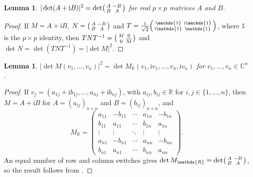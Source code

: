 \documentclass{birkjour}
\newcommand{\OMIT}[1]{\todo[color=gray!30]{#1}}  %
\newtheorem{lemma}[theorem]{Lemma}
\theoremstyle{definition}
\def\R			{\mathds{R}}
\def\C			{\mathds{C}}
\def\Id			{\mathds{1}}
\def\im	 					{\mathrm{i}}				%
\begin{document}
\begin{lemma}\label{pr:lema}
	$|\det (A+\im B)|^2 = \det \begin{psmallmatrix}
		A & -B \\
		B & A
	\end{psmallmatrix}$
	for real $p \times p$ matrices $A$ and $B$.
\end{lemma}
\begin{proof}
	If
	$M = A+\im B$,
	$N = \begin{psmallmatrix}
			A & -B \\
			B & A
		\end{psmallmatrix}$
	and 
	$T = \frac{1}{\sqrt{2}} 
	\begin{psmallmatrix}
		\Id & \im \Id \\
		\im \Id & \Id
	\end{psmallmatrix}$,
	where $\Id$ is the $p \times p$ identity,
	then
	\OMIT{$T^{-1} = \frac{1}{\sqrt{2}} \cdot
		\begin{psmallmatrix}
			\Id & -\im \Id \\
			-\im \Id & \Id
		\end{psmallmatrix}$}
	$T N T^{-1} = \begin{psmallmatrix}
		M & 0 \\
		0 & \overline{M}
	\end{psmallmatrix}$
	and
	$\det N = \det(T N T^{-1}) = |\det M|^2$.
\end{proof}



\begin{lemma}\label{pr:det MR}
	$|\det M(v_1,\ldots,v_n)|^2 = \det M_\R(v_1,\im v_1,\ldots,v_n,\im v_n)$ for $v_1,\ldots,v_n \in \C^n$.
\end{lemma}
\begin{proof}
	If $v_j = (a_{1j} + \im b_{1j},\ldots,a_{nj} + \im b_{nj})$, with $a_{ij},b_{ij}\in \R$ for $i,j \in \{1,\ldots,n\}$, then
	$M = A+\im B$ for $A = (a_{ij})_{n\times n}$ and $B=(b_{ij})_{n\times n}$, and
	\begin{equation*}
		M_\R = 
		\begin{pmatrix}
			a_{11} & -b_{11} & \cdots & a_{1n} & -b_{1n} \\
			b_{11} & a_{11} & \cdots & b_{1n} & a_{1n} \\
			\vdots & \vdots & \ddots & \vdots & \vdots \\
			a_{n1} & -b_{n1} & \cdots & a_{nn} & -b_{nn} \\
			b_{n1} & a_{n1} & \cdots & b_{nn} & a_{nn} 
		\end{pmatrix}.
	\end{equation*}
	An equal number of row and column switches gives
	$\det M_\R = 
	\det \begin{psmallmatrix}
		A & -B \\
		B & A
	\end{psmallmatrix}$,
	so the result follows from .
\end{proof}
\end{document}
